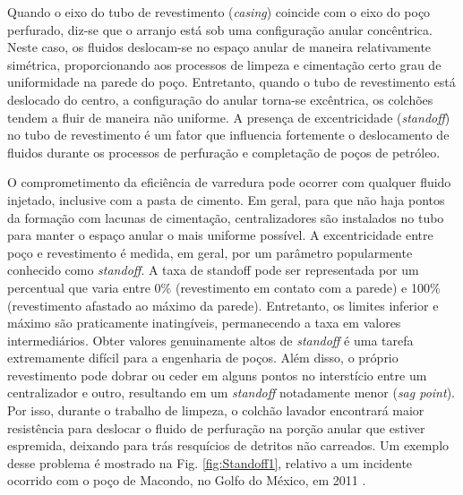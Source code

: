 Quando o eixo do tubo de revestimento (\textit{casing}) coincide com o eixo do poço perfurado, diz-se que o arranjo está sob uma configuração anular concêntrica. Neste caso, os fluidos deslocam-se no espaço anular de maneira relativamente simétrica, proporcionando aos processos de limpeza e cimentação certo grau de uniformidade na parede do poço. Entretanto, quando o tubo de revestimento está deslocado do centro, a configuração do anular torna-se excêntrica, os colchões tendem a fluir de maneira não uniforme. A presença de excentricidade (\textit{standoff}) no tubo de revestimento é um fator que influencia fortemente o deslocamento de fluidos durante os processos de perfuração e completação de poços de petróleo.

O comprometimento da eficiência de varredura pode ocorrer com qualquer fluido injetado, inclusive com a pasta de cimento. Em geral, para que não haja pontos da formação com lacunas de cimentação, centralizadores são instalados no tubo para manter o espaço anular o mais uniforme possível. 
A excentricidade entre poço e revestimento é medida, em geral, por um parâmetro popularmente conhecido como \textit{standoff}. A taxa de standoff pode ser representada por um percentual que varia entre 0\% (revestimento em contato com a parede) e 100\% (revestimento afastado ao máximo da parede). Entretanto, os limites inferior e máximo são praticamente inatingíveis, permanecendo a taxa em valores intermediários. 
Obter valores genuinamente altos de \textit{standoff} é uma tarefa extremamente difícil para a engenharia de poços. Além disso, o próprio revestimento pode dobrar ou ceder em alguns pontos no interstício entre um centralizador e outro, resultando em um \textit{standoff} notadamente menor (\textit{sag point}). Por isso, durante o trabalho de limpeza, o colchão lavador encontrará maior resistência para deslocar o fluido de perfuração na porção anular que estiver espremida, deixando para trás resquícios de detritos não carreados. Um exemplo desse problema é mostrado na Fig. \ref{fig:Standoff1}, relativo a um incidente ocorrido com o poço de Macondo, no Golfo do México, em 2011 
\cite{Macondo,Hanieh}.
